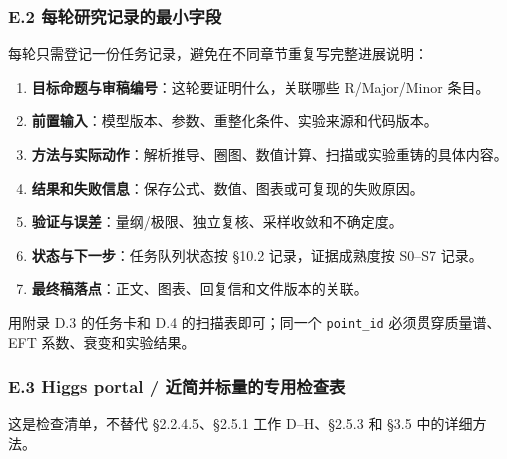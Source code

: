 \documentclass[
]{article}
\providecommand{\tightlist}{%
  \setlength{\itemsep}{0pt}\setlength{\parskip}{0pt}}
\begin{document}
\subsubsection{E.2
每轮研究记录的最小字段}\label{e.2-ux6bcfux8f6eux7814ux7a76ux8bb0ux5f55ux7684ux6700ux5c0fux5b57ux6bb5}

每轮只需登记一份任务记录，避免在不同章节重复写完整进展说明：

\begin{enumerate}
\def\labelenumi{\arabic{enumi}.}
\tightlist
\item
  \textbf{目标命题与审稿编号}：这轮要证明什么，关联哪些 R/Major/Minor
  条目。
\item
  \textbf{前置输入}：模型版本、参数、重整化条件、实验来源和代码版本。
\item
  \textbf{方法与实际动作}：解析推导、圈图、数值计算、扫描或实验重铸的具体内容。
\item
  \textbf{结果和失败信息}：保存公式、数值、图表或可复现的失败原因。
\item
  \textbf{验证与误差}：量纲/极限、独立复核、采样收敛和不确定度。
\item
  \textbf{状态与下一步}：任务队列状态按 §10.2 记录，证据成熟度按 S0--S7
  记录。
\item
  \textbf{最终稿落点}：正文、图表、回复信和文件版本的关联。
\end{enumerate}

用附录 D.3 的任务卡和 D.4 的扫描表即可；同一个 \texttt{point\_id}
必须贯穿质量谱、EFT 系数、衰变和实验结果。

\subsubsection{E.3 Higgs portal /
近简并标量的专用检查表}\label{e.3-higgs-portal-ux8fd1ux7b80ux5e76ux6807ux91cfux7684ux4e13ux7528ux68c0ux67e5ux8868}

这是检查清单，不替代 §2.2.4.5、§2.5.1 工作 D--H、§2.5.3 和 §3.5
中的详细方法。
\end{document}
